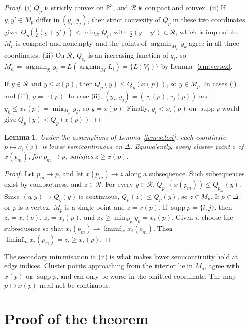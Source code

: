 \documentclass[11pt]{article}
\newtheorem{lemma}[theorem]{Lemma}
\theoremstyle{remark}
\newcommand{\R}{\mathbb R}
\newcommand{\Di}{\Delta^{\circ}}
\newcommand{\M}{\mathcal M}
\newcommand{\Rr}{\mathcal R}
\newcommand{\supp}{\operatorname{supp}}
\DeclareMathOperator*{\argmin}{argmin}
\begin{document}
\begin{proof}
(i) $Q_p$ is strictly convex on $\R^3$, and $\Rr$ is compact and convex. (ii) If $y,y'\in M_p$ differ in $(y_i,y_j)$, then strict convexity of $Q_p$ in these two coordinates gives $Q_p(\tfrac12(y+y'))<\min_\Rr Q_p$, with $\tfrac12(y+y')\in\Rr$, which is impossible. $M_p$ is compact and nonempty, and the points of $\argmin_{M_p}y_k$ agree in all three coordinates. (iii) On $\Rr$, $Q_{e_i}$ is an increasing function of $y_i$, so $M_{e_i}=\argmin_\Rr y_i=L(\argmin_\M L_i)=\{L(V_i)\}$ by Lemma~\ref{lem:vertex}.

If $y\in\Rr$ and $y\le x(p)$, then $Q_p(y)\le Q_p(x(p))$, so $y\in M_p$. In cases (i) and (iii), $y=x(p)$. In case (ii), $(y_i,y_j)=(x_i(p),x_j(p))$ and $y_k\le x_k(p)=\min_{M_p}y_k$, so $y=x(p)$. Finally, $y_i<x_i(p)$ on $\supp p$ would give $Q_p(y)<Q_p(x(p))$.
\end{proof}

\begin{lemma}\label{lem:lsc}
Under the assumptions of Lemma~\ref{lem:select}, each coordinate $p\mapsto x_i(p)$ is lower semicontinuous on $\Delta$. Equivalently, every cluster point $z$ of $x(p_m)$, for $p_m\to p$, satisfies $z\ge x(p)$.
\end{lemma}

\begin{proof}
Let $p_m\to p$, and let $x(p_m)\to z$ along a subsequence. Such subsequences exist by compactness, and $z\in\Rr$. For every $y\in\Rr$, $Q_{p_m}(x(p_m))\le Q_{p_m}(y)$. Since $(q,y)\mapsto Q_q(y)$ is continuous, $Q_p(z)\le Q_p(y)$, so $z\in M_p$. If $p\in\Di$ or $p$ is a vertex, $M_p$ is a single point and $z=x(p)$. If $\supp p=\{i,j\}$, then $z_i=x_i(p)$, $z_j=x_j(p)$, and $z_k\ge\min_{M_p}y_k=x_k(p)$. Given $i$, choose the subsequence so that $x_i(p_m)\to\liminf_mx_i(p_m)$. Then $\liminf_mx_i(p_m)=z_i\ge x_i(p)$.
\end{proof}

\noindent The secondary minimisation in (ii) is what makes lower semicontinuity hold at edge indices. Cluster points approaching from the interior lie in $M_p$, agree with $x(p)$ on $\supp p$, and can only be worse in the omitted coordinate. The map $p\mapsto x(p)$ need not be continuous.

\section{Proof of the theorem}\label{sec:proof}
\end{document}
